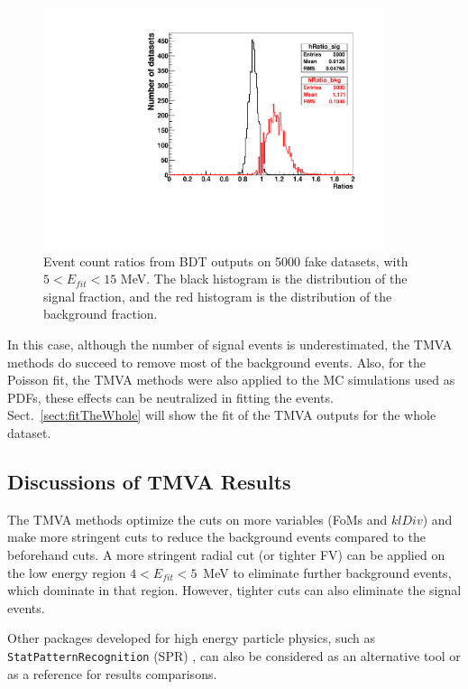 \begin{figure}[!htb]
	\centering
	\includegraphics[width=10cm]{TMVAratios_fakedataset.pdf}
	\caption[Event count fractions from BDT outputs on 5000 fake datasets, with $5<E_{fit}<15$ MeV.]{Event count ratios from BDT outputs on 5000 fake datasets, with $5<E_{fit}<15$ MeV. The black histogram is the distribution of the signal fraction, and the red histogram is the distribution of the background fraction.\label{fig:TMVAfractions}}
\end{figure}

In this case, although the number of signal events is underestimated, the TMVA methods do succeed to remove most of the background events. Also, for the Poisson fit, the TMVA methods were also applied to the MC simulations used as PDFs, these effects can be neutralized in fitting the events. Sect.~\ref{sect:fitTheWhole} will show the fit of the TMVA outputs for the whole dataset. 

\subsection{Discussions of TMVA Results}

The TMVA methods optimize the cuts on more variables (FoMs and $klDiv$) and make more stringent cuts to reduce the background events compared to the beforehand cuts. A more stringent radial cut (or tighter FV) can be applied on the low energy region $4<E_{fit}<5$~MeV to eliminate further background events, which dominate in that region. However, tighter cuts can also eliminate the signal events.

Other packages developed for high energy particle physics, such as \texttt{StatPatternRecognition} (SPR) \cite{sprWebsite}, can also be considered as an alternative tool or as a reference for results comparisons. 

